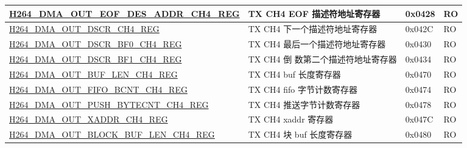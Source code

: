 \begin{longtable}{ | p{7.5cm} | p{5.7cm} | p{1.2cm} | p{1cm} | }
    \hyperref[regdesc:H264DMAOUTEOFDESADDRCH4REG]{H264\_DMA\_OUT\_EOF\_DES\_ADDR\_CH4\_REG} & TX CH4 EOF 描述符地址寄存器 & 0x0428 & RO \\ \hline
    \hyperref[regdesc:H264DMAOUTDSCRCH4REG]{H264\_DMA\_OUT\_DSCR\_CH4\_REG} & TX CH4 下一个描述符地址寄存器 & 0x042C & RO \\ \hline
    \hyperref[regdesc:H264DMAOUTDSCRBF0CH4REG]{H264\_DMA\_OUT\_DSCR\_BF0\_CH4\_REG} & TX CH4 最后一个描述符地址寄存器 & 0x0430 & RO \\ \hline
    \hyperref[regdesc:H264DMAOUTDSCRBF1CH4REG]{H264\_DMA\_OUT\_DSCR\_BF1\_CH4\_REG} & TX CH4 倒 数第二个描述符地址寄存器 & 0x0434 & RO \\ \hline
    \hyperref[regdesc:H264DMAOUTBUFLENCH4REG]{H264\_DMA\_OUT\_BUF\_LEN\_CH4\_REG} & TX CH4 buf 长度寄存器 & 0x0470 & RO \\ \hline
    \hyperref[regdesc:H264DMAOUTFIFOBCNTCH4REG]{H264\_DMA\_OUT\_FIFO\_BCNT\_CH4\_REG} & TX CH4 fifo 字节计数寄存器 & 0x0474 & RO \\ \hline
    \hyperref[regdesc:H264DMAOUTPUSHBYTECNTCH4REG]{H264\_DMA\_OUT\_PUSH\_BYTECNT\_CH4\_REG} & TX CH4 推送字节计数寄存器 & 0x0478 & RO \\ \hline
    \hyperref[regdesc:H264DMAOUTXADDRCH4REG]{H264\_DMA\_OUT\_XADDR\_CH4\_REG} & TX CH4 xaddr 寄存器 & 0x047C & RO \\ \hline
    \hyperref[regdesc:H264DMAOUTBLOCKBUFLENCH4REG]{H264\_DMA\_OUT\_BLOCK\_BUF\_LEN\_CH4\_REG} & TX CH4 块 buf 长度寄存器 & 0x0480 & RO \\ \hline


\end{longtable}
